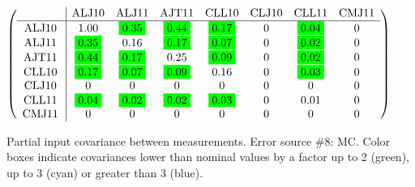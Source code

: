 \begin{table}[H]
\scriptsize
\begin{center}
\renewcommand{\arraystretch}{1.1}
\begin{math}\left(\begin{array}{c|ccccccc}
 & \mathrm{ALJ10} & 
\mathrm{ALJ11} & 
\mathrm{AJT11} & 
\mathrm{CLL10} & 
\mathrm{CLJ10} & 
\mathrm{CLL11} & 
\mathrm{CMJ11} \\
\hline
\mathrm{ALJ10} \hspace*{2pt} &       1.00 &  \colorbox{Green1}{$      0.35$} &  \colorbox{Green1}{$      0.44$} &  \colorbox{Green1}{$      0.17$} &  0 &  \colorbox{Green1}{$      0.04$} &  0 \\
\mathrm{ALJ11} \hspace*{2pt} &  \colorbox{Green1}{$      0.35$} &       0.16 &  \colorbox{Green1}{$      0.17$} &  \colorbox{Green1}{$      0.07$} &  0 &  \colorbox{Green1}{$      0.02$} &  0 \\
\mathrm{AJT11} \hspace*{2pt} &  \colorbox{Green1}{$      0.44$} &  \colorbox{Green1}{$      0.17$} &       0.25 &  \colorbox{Green1}{$      0.09$} &  0 &  \colorbox{Green1}{$      0.02$} &  0 \\
\mathrm{CLL10} \hspace*{2pt} &  \colorbox{Green1}{$      0.17$} &  \colorbox{Green1}{$      0.07$} &  \colorbox{Green1}{$      0.09$} &       0.16 &  0 &  \colorbox{Green1}{$      0.03$} &  0 \\
\mathrm{CLJ10} \hspace*{2pt} &  0 &  0 &  0 &  0 &  0 &  0 &  0 \\
\mathrm{CLL11} \hspace*{2pt} &  \colorbox{Green1}{$      0.04$} &  \colorbox{Green1}{$      0.02$} &  \colorbox{Green1}{$      0.02$} &  \colorbox{Green1}{$      0.03$} &  0 &       0.01 &  0 \\
\mathrm{CMJ11} \hspace*{2pt} &  0 &  0 &  0 &  0 &  0 &  0 &  0 \\
\end{array}\right)\end{math}
\caption{Partial input covariance between measurements. Error source \#8: MC. Color boxes indicate covariances lower than nominal values by a factor up to 2 (green), up to 3 (cyan) or greater than 3 (blue).}
\renewcommand{\arraystretch}{1}
\end{center}
\end{table}
